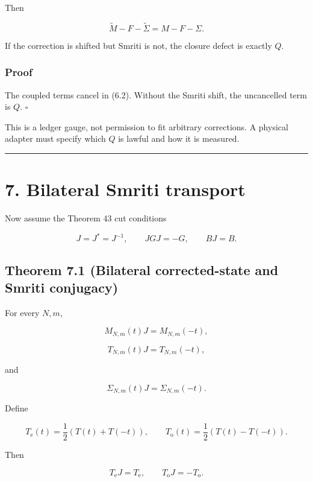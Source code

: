 Then

\[
\boxed{
\widetilde M-F-\widetilde\Sigma
=M-F-\Sigma.
}
\tag{6.2}
\]

If the correction is shifted but Smriti is not, the closure defect is exactly
\(Q\).

\hypertarget{proof-3}{%
\subsubsection{Proof}\label{proof-3}}

The coupled terms cancel in (6.2). Without the Smriti shift, the uncancelled
term is \(Q\). \(\square\)

This is a ledger gauge, not permission to fit arbitrary corrections. A physical
adapter must specify which \(Q\) is lawful and how it is measured.

\begin{center}\rule{0.5\linewidth}{0.5pt}\end{center}

\hypertarget{bilateral-smriti-transport}{%
\section{7. Bilateral Smriti transport}\label{bilateral-smriti-transport}}

Now assume the Theorem 43 cut conditions

\[
J=J^*=J^{-1},
\qquad
JGJ=-G,
\qquad
BJ=B.
\tag{7.1}
\]

\hypertarget{theorem-7.1-bilateral-corrected-state-and-smriti-conjugacy}{%
\subsection{Theorem 7.1 (Bilateral corrected-state and Smriti conjugacy)}\label{theorem-7.1-bilateral-corrected-state-and-smriti-conjugacy}}

For every \(N,m\),

\[
\boxed{M_{N,m}(t)J=M_{N,m}(-t),}
\tag{7.2}
\]

\[
\boxed{T_{N,m}(t)J=T_{N,m}(-t),}
\tag{7.3}
\]

and

\[
\boxed{\Sigma_{N,m}(t)J=\Sigma_{N,m}(-t).}
\tag{7.4}
\]

Define

\[
T_{\mathrm e}(t)=\frac12(T(t)+T(-t)),
\qquad
T_{\mathrm o}(t)=\frac12(T(t)-T(-t)).
\tag{7.5}
\]

Then

\[
\boxed{T_{\mathrm e}J=T_{\mathrm e},
\qquad
T_{\mathrm o}J=-T_{\mathrm o}.}
\tag{7.6}
\]

